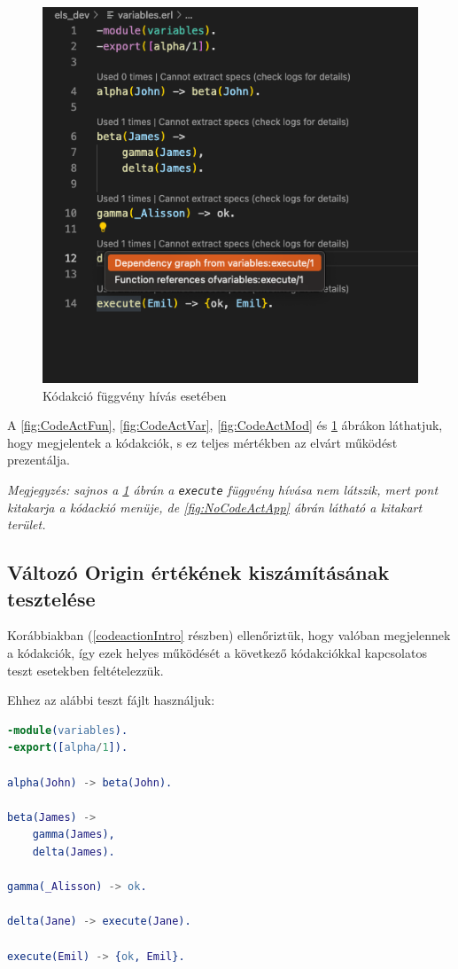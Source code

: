 \begin{figure}[H]
  \centering
  \includegraphics[width=0.7\linewidth]{images/testCases/CodeActApp.png}
  \caption{Kódakció függvény hívás esetében}
  \label{fig:CodeActApp}
\end{figure}

A \ref{fig:CodeActFun}, \ref{fig:CodeActVar}, \ref{fig:CodeActMod} és \ref{fig:CodeActApp} ábrákon láthatjuk, hogy megjelentek a kódakciók, s ez teljes mértékben az elvárt működést prezentálja. 

\textit{Megjegyzés: sajnos a \ref{fig:CodeActApp} ábrán a \lstinline{execute} függvény hívása nem látszik, mert pont kitakarja a kódackió menüje, de \ref{fig:NoCodeActApp} ábrán látható a kitakart terület. }



\subsection{Változó Origin értékének kiszámításának tesztelése}

Korábbiakban (\ref{codeactionIntro} részben) ellenőriztük, hogy valóban megjelennek a kódakciók, így ezek helyes működését a következő kódakciókkal kapcsolatos teszt esetekben feltételezzük.

\noindent Ehhez az alábbi teszt fájlt használjuk:

\begin{lstlisting}[language={erlang}]  
-module(variables).
-export([alpha/1]).

alpha(John) -> beta(John).

beta(James) -> 
    gamma(James), 
    delta(James).

gamma(_Alisson) -> ok.

delta(Jane) -> execute(Jane).

execute(Emil) -> {ok, Emil}.
\end{lstlisting}


